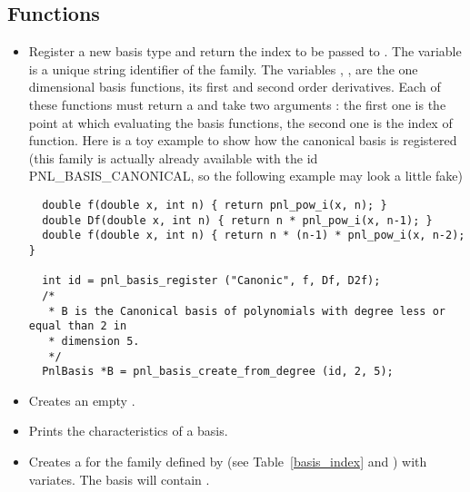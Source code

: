 \subsection{Functions}

\begin{itemize}
\item {}
\sshortdescribe Register a new basis type and return the index to be passed to
 . The variable  is a unique
string identifier of the family. The variables , ,  are
the one dimensional basis functions, its first and second order derivatives.
Each of these functions must return a  and take two arguments : the
first one is the point at which evaluating the basis functions, the second one
is the index of function. Here is a toy example to show how the canonical basis
is registered (this family is actually already available with the id
PNL_BASIS_CANONICAL, so the following example may look a little fake)
\begin{verbatim}
  double f(double x, int n) { return pnl_pow_i(x, n); }
  double Df(double x, int n) { return n * pnl_pow_i(x, n-1); }
  double f(double x, int n) { return n * (n-1) * pnl_pow_i(x, n-2); }

  int id = pnl_basis_register ("Canonic", f, Df, D2f);
  /*
   * B is the Canonical basis of polynomials with degree less or equal than 2 in
   * dimension 5.
   */
  PnlBasis *B = pnl_basis_create_from_degree (id, 2, 5);
  \end{verbatim}

\item {}
  \sshortdescribe Creates an empty .

\item {}
  \sshortdescribe Prints the characteristics of a basis.
  
  
\item {}
  \sshortdescribe Creates a  for the family
  defined by  (see Table~\ref{basis_index} and
  ) with 
  variates. The basis will contain .


\end{itemize}
